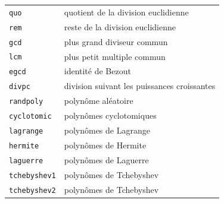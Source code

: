 \documentclass{article}
\begin{document}
\begin{center}
\begin{tabular}{|ll|}
\hline
\verb|quo| & quotient de la division euclidienne\\
\verb|rem| & reste de la division euclidienne\\
\verb|gcd| & plus grand diviseur commun\\
\verb|lcm| & plus petit multiple commun\\
\verb|egcd| & identit\'e de Bezout\\
\verb|divpc| & division suivant les puissances croissantes\\
\hline
\verb|randpoly| & polyn\^ome al\'eatoire\\
\verb|cyclotomic| & polyn\^omes cyclotomiques\\
\verb|lagrange| & polyn\^omes de Lagrange\\
\verb|hermite| & polyn\^omes de Hermite\\
\verb|laguerre| & polyn\^omes de Laguerre\\
\verb|tchebyshev1| & polyn\^omes de Tchebyshev\\
\verb|tchebyshev2| & polyn\^omes de Tchebyshev\\
\hline
\end{tabular}
\end{center}
%
\end{document}
